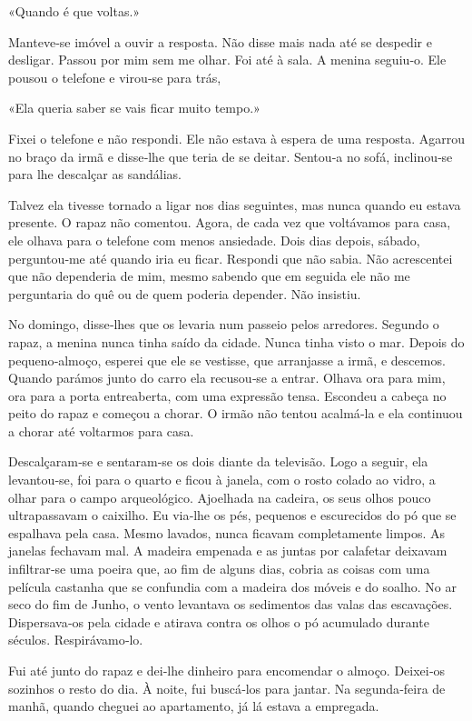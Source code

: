 «Quando é que voltas.»

Manteve­‑se imóvel a ouvir a resposta. Não disse mais nada até se
despedir e desligar. Passou por mim sem me olhar. Foi até à sala. A
menina seguiu­‑o. Ele pousou o telefone e virou­‑se para trás,

«Ela queria saber se vais ficar muito tempo.»

Fixei o telefone e não respondi. Ele não estava à espera de uma
resposta. Agarrou no braço da irmã e disse­‑lhe que teria de se deitar.
Sentou­‑a no sofá, inclinou­‑se para lhe descalçar as sandálias.

Talvez ela tivesse tornado a ligar nos dias seguintes, mas nunca quando
eu estava presente. O rapaz não comentou. Agora, de cada vez que
voltávamos para casa, ele olhava para o telefone com menos ansiedade.
Dois dias depois, sábado, perguntou­‑me até quando iria eu ficar.
Respondi que não sabia. Não acrescentei que não dependeria de mim, mesmo
sabendo que em seguida ele não me perguntaria do quê ou de quem poderia
depender. Não insistiu.

No domingo, disse­‑lhes que os levaria num passeio pelos arredores.
Segundo o rapaz, a menina nunca tinha saído da cidade. Nunca tinha visto
o mar. Depois do pequeno­‑almoço, esperei que ele se vestisse, que
arranjasse a irmã, e descemos. Quando parámos junto do carro ela
recusou­‑se a entrar. Olhava ora para mim, ora para a porta entreaberta,
com uma expressão tensa. Escondeu a cabeça no peito do rapaz e começou a
chorar. O irmão não tentou acalmá­‑la e ela continuou a chorar até
voltarmos para casa.

Descalçaram­‑se e sentaram­‑se os dois diante da televisão. Logo a
seguir, ela levantou­‑se, foi para o quarto e ficou à janela, com o
rosto colado ao vidro, a olhar para o campo arqueológico. Ajoelhada na
cadeira, os seus olhos pouco ultrapassavam o caixilho. Eu via­‑lhe os
pés, pequenos e escurecidos do pó que se espalhava pela casa. Mesmo
lavados, nunca ficavam completamente limpos. As janelas fechavam mal. A
madeira empenada e as juntas por calafetar deixavam infiltrar­‑se uma
poeira que, ao fim de alguns dias, cobria as coisas com uma película
castanha que se confundia com a madeira dos móveis e do soalho. No ar
seco do fim de Junho, o vento levantava os sedimentos das valas das
escavações. Dispersava­‑os pela cidade e atirava contra os olhos o pó
acumulado durante séculos. Respirávamo­‑lo.

Fui até junto do rapaz e dei­‑lhe dinheiro para encomendar o almoço.
Deixei­‑os sozinhos o resto do dia. À noite, fui buscá­‑los para jantar.
Na segunda­‑feira de manhã, quando cheguei ao apartamento, já lá estava
a empregada.


